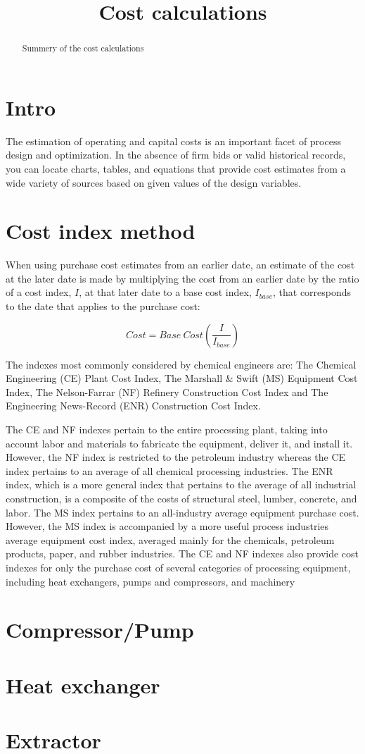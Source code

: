 \documentclass[]{article}
\title{Cost calculations}
\author{}
\begin{document}
\maketitle

\begin{abstract}
Summery of the cost calculations
\end{abstract}

\section{Intro}

The estimation of operating and capital costs is an important facet of process design and optimization. In the absence of firm bids or valid historical records, you can locate charts, tables, and equations that provide cost estimates from a wide variety of sources based on given values of the design variables.

\section{Cost index method}

When using purchase cost estimates from an earlier date, an estimate of the cost at the later date is made by multiplying the cost from an earlier date by the ratio of a cost index, $I$, at that later date to a base cost index, $I_{base}$, that corresponds to the date that applies to the purchase cost:

{\footnotesize
\begin{equation}
	Cost = Base~Cost \left(\frac{I}{I_{base}}\right)
	\end{equation}}

The indexes most commonly considered by chemical engineers are: The Chemical Engineering (CE) Plant Cost Index, The Marshall \& Swift (MS) Equipment Cost Index, The Nelson-Farrar (NF) Refinery Construction Cost Index and The Engineering News-Record (ENR) Construction Cost Index.

The CE and NF indexes pertain to the entire processing plant, taking into account labor and materials to fabricate the equipment, deliver it, and install it. However, the NF index is restricted to the petroleum industry whereas the CE index pertains to an average of all chemical processing industries. The ENR index, which is a more general index that pertains to the average of all industrial construction, is a composite of the costs of structural steel, lumber, concrete, and labor. The MS index pertains to an all-industry average equipment purchase cost. However, the MS index is accompanied by a more useful process industries average equipment cost index, averaged mainly for the chemicals, petroleum products, paper, and rubber industries. The CE and NF indexes also provide cost indexes for only the purchase cost of several categories of processing equipment, including heat exchangers, pumps and compressors, and machinery

\section{Compressor/Pump}

\section{Heat exchanger}

\section{Extractor}
\end{document}
